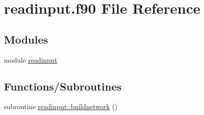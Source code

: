 \hypertarget{readinput_8f90}{
\section{readinput.f90 File Reference}
\label{readinput_8f90}
}
\subsection*{Modules}
\begin{DoxyCompactItemize}
\item 
module \hyperlink{namespacereadinput}{readinput}
\end{DoxyCompactItemize}
\subsection*{Functions/Subroutines}
\begin{DoxyCompactItemize}
\item 
subroutine \hyperlink{namespacereadinput_a29790780c02003cbcba39bb214e7ffd0}{readinput::buildnetwork} ()
\end{DoxyCompactItemize}
